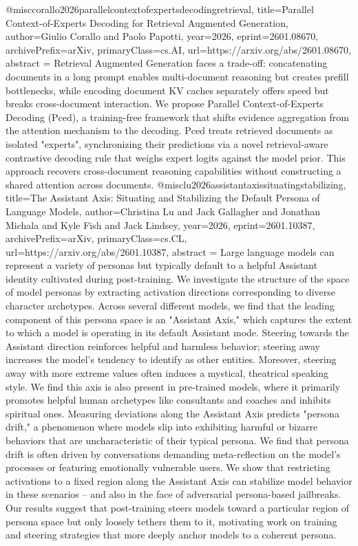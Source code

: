 {}@misc{corallo2026parallelcontextofexpertsdecodingretrieval,
      title={Parallel Context-of-Experts Decoding for Retrieval Augmented Generation}, 
      author={Giulio Corallo and Paolo Papotti},
      year={2026},
      eprint={2601.08670},
      archivePrefix={arXiv},
      primaryClass={cs.AI},
      url={https://arxiv.org/abs/2601.08670},
      abstract = {Retrieval Augmented Generation faces a trade-off: concatenating documents in a long prompt enables multi-document reasoning but creates prefill bottlenecks, while encoding document KV caches separately offers speed but breaks cross-document interaction. We propose Parallel Context-of-Experts Decoding (Pced), a training-free framework that shifts evidence aggregation from the attention mechanism to the decoding. Pced treats retrieved documents as isolated "experts", synchronizing their predictions via a novel retrieval-aware contrastive decoding rule that weighs expert logits against the model prior. This approach recovers cross-document reasoning capabilities without constructing a shared attention across documents.}
}@misc{lu2026assistantaxissituatingstabilizing,
      title={The Assistant Axis: Situating and Stabilizing the Default Persona of Language Models}, 
      author={Christina Lu and Jack Gallagher and Jonathan Michala and Kyle Fish and Jack Lindsey},
      year={2026},
      eprint={2601.10387},
      archivePrefix={arXiv},
      primaryClass={cs.CL},
      url={https://arxiv.org/abs/2601.10387},
      abstract = {Large language models can represent a variety of personas but typically default to a helpful Assistant identity cultivated during post-training. We investigate the structure of the space of model personas by extracting activation directions corresponding to diverse character archetypes. Across several different models, we find that the leading component of this persona space is an "Assistant Axis," which captures the extent to which a model is operating in its default Assistant mode. Steering towards the Assistant direction reinforces helpful and harmless behavior; steering away increases the model's tendency to identify as other entities. Moreover, steering away with more extreme values often induces a mystical, theatrical speaking style. We find this axis is also present in pre-trained models, where it primarily promotes helpful human archetypes like consultants and coaches and inhibits spiritual ones. Measuring deviations along the Assistant Axis predicts "persona drift," a phenomenon where models slip into exhibiting harmful or bizarre behaviors that are uncharacteristic of their typical persona. We find that persona drift is often driven by conversations demanding meta-reflection on the model's processes or featuring emotionally vulnerable users. We show that restricting activations to a fixed region along the Assistant Axis can stabilize model behavior in these scenarios -- and also in the face of adversarial persona-based jailbreaks. Our results suggest that post-training steers models toward a particular region of persona space but only loosely tethers them to it, motivating work on training and steering strategies that more deeply anchor models to a coherent persona.}
}
